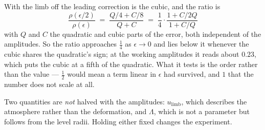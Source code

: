 With the limb off the leading correction is the cubic, and the ratio is
\begin{equation}
  \frac{\rho(\epsilon/2)}{\rho(\epsilon)}
  \;=\; \frac{Q/4 + C/8}{Q + C}
  \;=\; \frac{1}{4}\cdot\frac{1 + C/2Q}{1 + C/Q}
  \label{eq:halving-with-cubic}
\end{equation}
with $Q$ and $C$ the quadratic and cubic parts of the error, both independent of the amplitudes.
So the ratio approaches $\tfrac14$ as $\epsilon \to 0$ and lies below it whenever the cubic shares
the quadratic's sign; at the working amplitudes it reads about $0.23$, which puts the cubic at a
fifth of the quadratic.  What it tests is the order rather than the value --- $\tfrac12$ would
mean a term linear in $\epsilon$ had survived, and $1$ that the number does not scale at all.

Two quantities are \emph{not} halved with the amplitudes: $u_\text{limb}$, which describes the
atmosphere rather than the deformation, and $\Lambda$, which is not a parameter but follows from
the level radii.  Holding either fixed changes the experiment.
